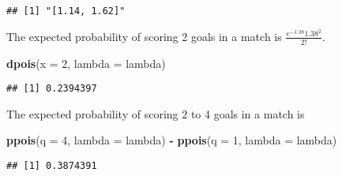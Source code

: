 \documentclass[
]{book}
\newenvironment{Shaded}{\begin{snugshade}}{\end{snugshade}}
\newcommand{\DataTypeTok}[1]{\textcolor[rgb]{0.13,0.29,0.53}{#1}}
\newcommand{\DecValTok}[1]{\textcolor[rgb]{0.00,0.00,0.81}{#1}}
\newcommand{\KeywordTok}[1]{\textcolor[rgb]{0.13,0.29,0.53}{\textbf{#1}}}
\newcommand{\NormalTok}[1]{#1}
\newcommand{\OperatorTok}[1]{\textcolor[rgb]{0.81,0.36,0.00}{\textbf{#1}}}
\newcommand{\StringTok}[1]{\textcolor[rgb]{0.31,0.60,0.02}{#1}}
\begin{document}
\begin{verbatim}
## [1] "[1.14, 1.62]"
\end{verbatim}

The expected probability of scoring 2 goals in a match is \(\frac{e^{-1.38} 1.38^2}{2!}\).

\begin{Shaded}
\begin{Highlighting}[]
\KeywordTok{dpois}\NormalTok{(}\DataTypeTok{x =} \DecValTok{2}\NormalTok{, }\DataTypeTok{lambda =}\NormalTok{ lambda)}
\end{Highlighting}
\end{Shaded}

\begin{verbatim}
## [1] 0.2394397
\end{verbatim}

The expected probability of scoring 2 to 4 goals in a match is

\begin{Shaded}
\begin{Highlighting}[]
\KeywordTok{ppois}\NormalTok{(}\DataTypeTok{q =} \DecValTok{4}\NormalTok{, }\DataTypeTok{lambda =}\NormalTok{ lambda) }\OperatorTok{-}\StringTok{ }
\StringTok{  }\KeywordTok{ppois}\NormalTok{(}\DataTypeTok{q =} \DecValTok{1}\NormalTok{, }\DataTypeTok{lambda =}\NormalTok{ lambda)}
\end{Highlighting}
\end{Shaded}

\begin{verbatim}
## [1] 0.3874391
\end{verbatim}
\end{document}
